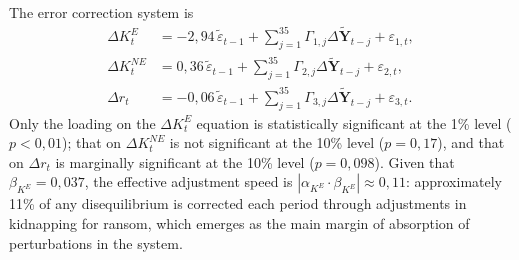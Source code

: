 \documentclass[ecta,nameyear,draft]{econsocart}
\theoremstyle{plain}
\theoremstyle{definition}
\newcommand{\1}{\mathbf{1}}
\begin{document}
The error correction system is
\begin{align}
\Delta K^E_t &= -2{,}94\,\tilde{\varepsilon}_{t-1} +
\sum_{j=1}^{35}\Gamma_{1,j}\Delta \tilde{\mathbf{Y}}_{t-j} + \varepsilon_{1,t}, \label{eq:vec1}\\
\Delta K^{NE}_t &= 0{,}36\,\tilde{\varepsilon}_{t-1} +
\sum_{j=1}^{35}\Gamma_{2,j}\Delta \tilde{\mathbf{Y}}_{t-j} + \varepsilon_{2,t}, \label{eq:vec2}\\
\Delta r_t &= -0{,}06\,\tilde{\varepsilon}_{t-1} +
\sum_{j=1}^{35}\Gamma_{3,j}\Delta \tilde{\mathbf{Y}}_{t-j} + \varepsilon_{3,t}. \label{eq:vec3}
\end{align}
Only the loading on the $\Delta K^E_t$ equation is statistically significant at the 1\% level ($p<0{,}01$); that on $\Delta K^{NE}_t$ is not significant at the 10\% level ($p=0{,}17$), and that on $\Delta r_t$ is marginally significant at the 10\% level ($p=0{,}098$). Given that $\beta_{K^E} = 0{,}037$, the effective adjustment speed is $|\alpha_{K^E} \cdot \beta_{K^E}| \approx 0{,}11$: approximately 11\% of any disequilibrium is corrected each period through adjustments in kidnapping for ransom, which emerges as the main margin of absorption of perturbations in the system.
\end{document}
